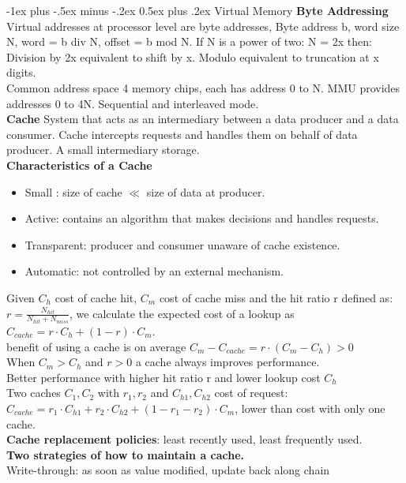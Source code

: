 \documentclass[letterpaper, 8pt]{extarticle}
\makeatletter
\renewcommand{\section}{\@startsection{section}{1}{0mm}%
                                {-1ex plus -.5ex minus -.2ex}%
                                {0.5ex plus .2ex}%
                                {\normalfont\normalsize\bfseries}}
\makeatother
\begin{document}
\begin{multicols*}{6}
    \section{Virtual Memory}
	\textbf{Byte Addressing} Virtual addresses at processor level are byte addresses, Byte address b, word size N, word = b div N, offset = b mod N. If N is a power of two: N = 2x then: Division by 2x equivalent to shift by x. Modulo equivalent to truncation at x digits.\\
	Common address space 4 memory chips, each has address 0 to N. MMU provides addresses 0 to 4N. Sequential and interleaved mode.\\
	\textbf{Cache} System that acts as an intermediary between a data producer and a data consumer. Cache intercepts requests and handles them on behalf of data producer. A small intermediary storage.\\
	\textbf{Characteristics of a Cache}
	\begin{itemize}
	\item Small : size of cache $\ll$ size of data at producer.
	\item Active: contains an algorithm that makes decisions and handles requests.
	\item Transparent: producer and consumer unaware of cache existence.
	\item Automatic: not controlled by an external mechanism.
	\end{itemize}
	Given $C_h$ cost of cache hit, $C_m$ cost of cache miss and the hit ratio r defined as: $r = \frac{N_{hit}}{N_{hit} + N_{miss}}$, we calculate the expected cost of a lookup as $C_{cache} = r \cdot C_h + (1 - r) \cdot C_m$. \\
	benefit of using a cache is on average $C_m - C_{cache} = r \cdot (C_m - C_h) > 0$\\
	When $C_m > C_h$ and $r > 0$ a cache always improves performance.\\
	Better performance with higher hit ratio r and lower lookup cost $C_h$\\
	Two caches $C_1, C_2$ with $r_1, r_2$ and $C_{h1}, C_{h2}$ cost of request: $C_{cache} = r_1 \cdot C_{h1} + r_2 \cdot C_{h2} + (1 - r_1 - r_2 ) \cdot C_m$, lower than cost with only one cache. \\
	\textbf{Cache replacement policies}: least recently used, least frequently used.\\
	\textbf{Two strategies of how to maintain a cache.}\\
	Write-through: as soon as value modified, update back along chain\\

\end{multicols*}
\end{document}
